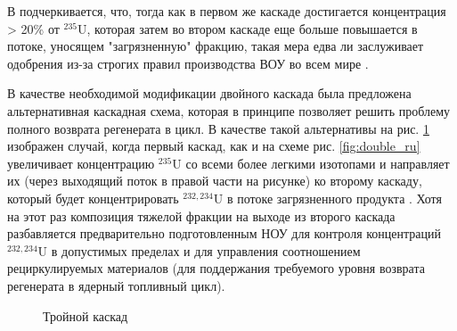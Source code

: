 В \cite{palkinPurificationReprocessedUranium2016} подчеркивается, что, тогда как в первом же каскаде достигается концентрация > 20\% от $^{235}$U, которая затем во втором каскаде еще больше повышается в потоке, уносящем "загрязненную" фракцию, такая мера едва ли заслуживает одобрения из-за строгих правил производства ВОУ во всем мире \cite{ManagementHighEnriched2005}.

В качестве необходимой модификации двойного каскада была предложена альтернативная каскадная схема, которая в принципе позволяет решить проблему полного возврата регенерата в цикл. В качестве такой альтернативы на рис. \ref{fig:triple} изображен случай, когда первый каскад, как и на схеме рис. \ref{fig:double_ru} увеличивает концентрацию $^{235}$U со всеми более легкими изотопами и направляет их (через выходящий поток в правой части на рисунке) ко второму каскаду, который будет концентрировать $^{232,234}$U в потоке загрязненного продукта \cite{smirnovObogashchenieRegenerirovannogoUrana2018}. Хотя на этот раз композиция тяжелой фракции на выходе из второго каскада разбавляется предварительно подготовленным НОУ для контроля концентраций $^{232,234}$U в допустимых пределах и для управления соотношением рециркулируемых материалов (для поддержания требуемого уровня возврата регенерата в ядерный топливный цикл).
\begin{figure}[ht]
  \caption{Тройной каскад}\label{fig:triple}
\end{figure}

